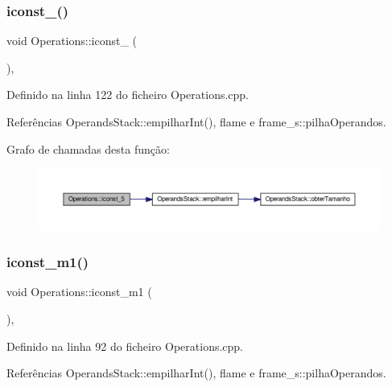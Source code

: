 \subsubsection{\texorpdfstring{iconst\+\_()}{iconst\_5()}}
{\footnotesize\ttfamily void Operations\+::iconst\+\_ (\begin{DoxyParamCaption}{ }\end{DoxyParamCaption})\hspace{0.3cm}{\ttfamily [static]}, {\ttfamily [private]}}



Definido na linha 122 do ficheiro Operations.\+cpp.



Referências Operands\+Stack\+::empilhar\+Int(), flame e frame\+\_\+s\+::pilha\+Operandos.

Grafo de chamadas desta função\+:
\nopagebreak
\begin{figure}[H]
\begin{center}
\leavevmode
\includegraphics[width=350pt]{classOperations_a87a4c7214825d084ded4a8ea50e4af7c_cgraph}
\end{center}
\end{figure}
\mbox{\label{classOperations_abb57552d42047d4b685b2d68db6b1fd7}} 
\subsubsection{\texorpdfstring{iconst\+\_\+m1()}{iconst\_m1()}}
{\footnotesize\ttfamily void Operations\+::iconst\+\_\+m1 (\begin{DoxyParamCaption}{ }\end{DoxyParamCaption})\hspace{0.3cm}{\ttfamily [static]}, {\ttfamily [private]}}



Definido na linha 92 do ficheiro Operations.\+cpp.



Referências Operands\+Stack\+::empilhar\+Int(), flame e frame\+\_\+s\+::pilha\+Operandos.

